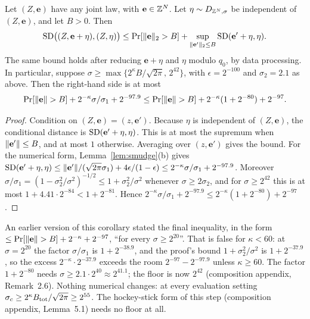 \begin{corollary}\label{cor:flood}
Let $(Z,\mathbf e)$ have any joint law, with $\mathbf e\in\mathbb{Z}^N$. Let $\eta\sim D_{\mathbb{Z}^N,\sigma}$ be independent of $(Z,\mathbf e)$, and let $B>0$. Then
\[
  \mathrm{SD}\bigl((Z,\mathbf e+\eta),(Z,\eta)\bigr)\le\Pr[\lVert \mathbf e\rVert_2>B]+\sup_{\lVert \mathbf e'\rVert_2\le B}\mathrm{SD}(\mathbf e'+\eta,\eta).
\]
The same bound holds after reducing $\mathbf e+\eta$ and $\eta$ modulo $q_0$, by data processing. In particular, suppose $\sigma\ge\max\{2^{\kappa}B/\sqrt{2\pi},\,2^{42}\}$, with $\epsilon=2^{-100}$ and $\sigma_2=2.1$ as above. Then the right-hand side is at most
\[
  \Pr[\lVert \mathbf e\rVert>B]+2^{-\kappa}\sigma/\sigma_1+2^{-97.9}\le\Pr[\lVert \mathbf e\rVert>B]+2^{-\kappa}(1+2^{-80})+2^{-97}.
\]
\end{corollary}
\begin{proof}
Condition on $(Z,\mathbf e)=(z,\mathbf e')$. Because $\eta$ is independent of $(Z,\mathbf e)$, the conditional distance is $\mathrm{SD}(\mathbf e'+\eta,\eta)$. This is at most the supremum when $\lVert \mathbf e'\rVert\le B$, and at most $1$ otherwise. Averaging over $(z,\mathbf e')$ gives the bound. For the numerical form, Lemma~\ref{lem:smudge}(b) gives $\mathrm{SD}(\mathbf e'+\eta,\eta)\le\lVert \mathbf e'\rVert/(\sqrt{2\pi}\sigma_1)+4\epsilon/(1-\epsilon)\le2^{-\kappa}\sigma/\sigma_1+2^{-97.9}$. Moreover $\sigma/\sigma_1=(1-\sigma_2^2/\sigma^2)^{-1/2}\le1+\sigma_2^2/\sigma^2$ whenever $\sigma\ge2\sigma_2$, and for $\sigma\ge2^{42}$ this is at most $1+4.41\cdot2^{-84}<1+2^{-81}$. Hence $2^{-\kappa}\sigma/\sigma_1+2^{-97.9}\le2^{-\kappa}(1+2^{-80})+2^{-97}$.
\end{proof}

\begin{remark}\label{rem:floor42}
An earlier version of this corollary stated the final inequality, in the form $\le\Pr[\lVert \mathbf e\rVert>B]+2^{-\kappa}+2^{-97}$, ``for every $\sigma\ge2^{20}$''. That is false for $\kappa<60$: at $\sigma=2^{20}$ the factor $\sigma/\sigma_1$ is $1+2^{-38.9}$, and the proof's bound $1+\sigma_2^2/\sigma^2$ is $1+2^{-37.9}$, so the excess $2^{-\kappa}\cdot2^{-37.9}$ exceeds the room $2^{-97}-2^{-97.9}$ unless $\kappa\ge60$. The factor $1+2^{-80}$ needs $\sigma\ge2.1\cdot2^{40}\approx2^{41.1}$; the floor is now $2^{42}$ (composition appendix, Remark~2.6). Nothing numerical changes: at every evaluation setting $\sigma_c\ge2^{\kappa}B_{\mathrm{tot}}/\sqrt{2\pi}\ge2^{55}$. The hockey-stick form of this step (composition appendix, Lemma~5.1) needs no floor at all.
\end{remark}

